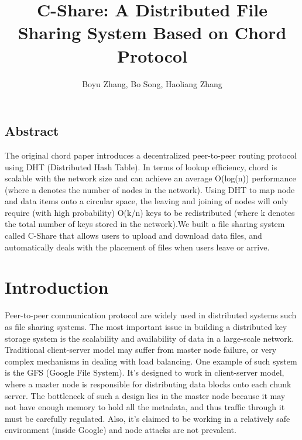 \documentclass[letterpaper,twocolumn,10pt]{article}
\begin{document}
\title{\Large  C-Share: A Distributed File Sharing System Based on Chord Protocol}
\author{Boyu Zhang, Bo Song, Haoliang Zhang}

\date{}
\maketitle


\subsection*{Abstract}

The original chord paper introduces a decentralized peer-to-peer routing protocol using DHT (Distributed Hash Table). In terms of lookup efficiency, chord is scalable with the network size and can achieve an average O(log(n)) performance (where n denotes the number of nodes in the network). Using DHT to map node and data items onto a circular space, the leaving and joining of nodes will only require (with high probability) O(k/n) keys to be redistributed (where k denotes the total number of keys stored in the network).We built a file sharing system called C-Share that allows users to upload and download data files, and automatically deals with the placement of files when users leave or arrive. 

\section{Introduction}

Peer-to-peer communication protocol are widely used in distributed systems such as file sharing systems. The most important issue in building a distributed key storage system is the scalability and availability of data in a large-scale network. Traditional client-server model may suffer from master node failure, or very complex mechanisms in dealing with load balancing. One example of such system is the GFS (Google File System). It's designed to work in client-server model, where a master node is responsible for distributing data blocks onto each chunk server. The bottleneck of such a design lies in the master node because it may not have enough memory to hold all the metadata, and thus traffic through it must be carefully regulated. Also, it's claimed to be working in a relatively safe environment (inside Google) and node attacks are not prevalent.
\end{document}
